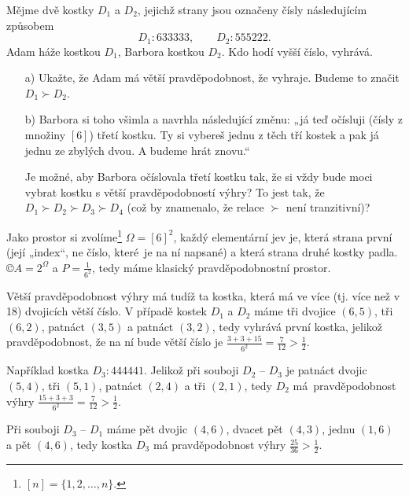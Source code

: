 \documentclass[12pt]{article}					%
\begin{document}
\pagebreak
\begin{priklad}
	Mějme dvě kostky $D_1$ a $D_2$, jejichž strany jsou označeny čísly následujícím způsobem
	$$ D_1: 633333, \qquad D_2: 555222. $$
	Adam háže kostkou $D_1$, Barbora kostkou $D_2$. Kdo hodí vyšší číslo, vyhrává.

	\begin{itemize}
		\item[a)] Ukažte, že Adam má větší pravděpodobnost, že vyhraje. Budeme to značit $D_1 \succ D_2$.
		\item[b)] Barbora si toho všimla a navrhla následující změnu: „já teď očísluji (čísly z množiny $[6]$) třetí kostku. Ty si vybereš jednu z těch tří kostek a pak já jednu ze zbylých dvou. A budeme hrát znovu.“

			Je možné, aby Barbora očíslovala třetí kostku tak, že si vždy bude moci vybrat kostku s větší pravděpodobností výhry? To jest tak, že $D_1 \succ D_2 \succ D_3 \succ D_4$ (což by znamenalo, že relace $\succ$ není tranzitivní)?
	\end{itemize}

	\begin{dukazin}[a]
		Jako prostor si zvolíme\footnote{$[n] = \{1, 2, …, n\}$.} $\Omega = [6]^2$, každý elementární jev je, která strana první (její „index“, ne číslo, které je na ní napsané) a která strana druhé kostky padla. $©A = 2^\Omega$ a $P = \frac{1}{6^2}$, tedy máme klasický pravděpodobnostní prostor.

		Větší pravděpodobnost výhry má tudíž ta kostka, která má ve více (tj. více než v 18) dvojicích větší číslo. V případě kostek $D_1$ a $D_2$ máme tři dvojice $(6, 5)$, tři $(6, 2)$, patnáct $(3, 5)$ a patnáct $(3, 2)$, tedy vyhrává první kostka, jelikož pravděpodobnost, že na ní bude větší číslo je $\frac{3 + 3 + 15}{6^2} = \frac{7}{12} > \frac{1}{2}$.
	\end{dukazin}

	\begin{reseni}[b]
		Například kostka $D_3: 444441$. Jelikož při souboji $D_2$ -- $D_3$ je patnáct dvojic $(5, 4)$, tři $(5, 1)$, patnáct $(2, 4)$ a tři $(2, 1)$, tedy $D_2$ má pravděpodobnost výhry $\frac{15 + 3 + 3}{6^2} = \frac{7}{12} > \frac{1}{2}$.

		Při souboji $D_3$ -- $D_1$ máme pět dvojic $(4, 6)$, dvacet pět $(4, 3)$, jednu $(1, 6)$ a pět $(4, 6)$, tedy kostka $D_3$ má pravděpodobnost výhry $\frac{25}{36} > \frac{1}{2}$.
	\end{reseni}
\end{priklad}
\end{document}
